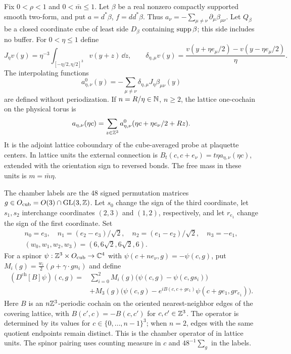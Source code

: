 Fix $0<\rho<1$ and $0<\bar m\le1$. Let $\beta$ be a real nonzero compactly
supported smooth two-form, and put $a=d^*\beta$, $f=dd^*\beta$.
Thus $a_\nu=-\sum_{\mu\ne\nu}\partial_\mu\beta_{\mu\nu}$.
Let $Q_\beta$ be a closed coordinate cube of least side $D_\beta$
containing $\operatorname{supp}\beta$; this side includes no buffer. For $0<\eta\le1$
define
\[
 J_\eta v(y)=\eta^{-3}\int_{[-\eta/2,\eta/2]^3}v(y+z)\,\dd z,
 \qquad
 \delta_{\eta,\mu}v(y)=
      \frac{v(y+\eta e_\mu/2)-v(y-\eta e_\mu/2)}{\eta}.
\]
The interpolating functions
\begin{equation}\label{eq:response-lattice-probe}
 a_{\eta,\nu}^0(y)=-\sum_{\mu\ne\nu}
               \delta_{\eta,\mu}J_\eta\beta_{\mu\nu}(y)
\end{equation}
are defined without periodization. If $n=R/\eta\in\mathbb N$, $n\ge2$,
the lattice one-cochain on the physical torus is
\begin{equation}\label{eq:response-periodic-probe}
 a_{\eta,\nu}(\eta c)=\sum_{z\in\mathbb Z^3}
       a_{\eta,\nu}^0(\eta c+\eta e_\nu/2+Rz).
\end{equation}
It is the adjoint lattice coboundary of the cube-averaged probe
at plaquette centers. In lattice units the external connection
is $B_t(c,c+e_\nu)=t\eta a_{\eta,\nu}(\eta c)$, extended with
the orientation sign to reversed bonds. The free mass in
these units is $m=\bar m\eta$.


The chamber labels are the $48$ signed permutation matrices
$g\in O_{\mathrm{cub}}=O(3)\cap\operatorname{GL}(3,\mathbb Z)$.
Let $s_0$ change the sign of the third coordinate, let $s_1,s_2$
interchange coordinates $(2,3)$ and $(1,2)$, respectively, and let
$r_{e_1}$ change the sign of the first coordinate. Set
\begin{gather*}
 n_0=e_3,\quad n_1=(e_2-e_3)/\sqrt2,\quad
 n_2=(e_1-e_2)/\sqrt2,\quad n_3=-e_1,\\
 (w_0,w_1,w_2,w_3)=(6,6\sqrt2,6\sqrt2,6).
\end{gather*}
For a spinor $\psi:\mathbb Z^3\times O_{\mathrm{cub}}\to\mathbb C^4$ with
$\psi(c+ne_\nu,g)=-\psi(c,g)$, put
$M_i(g)=\frac{w_i}{2}(\rho+\gamma\cdot gn_i)$ and define
\begin{equation}\label{eq:prm-chamber-operator}
\begin{split}
 (D^{\mathrm{ch}}[B]\psi)(c,g)
 ={}&\sum_{i=0}^2M_i(g)\bigl(\psi(c,g)-\psi(c,gs_i)\bigr)\\
 &+M_3(g)\bigl(\psi(c,g)
       -e^{iB(c,c+ge_1)}\psi(c+ge_1,gr_{e_1})\bigr).
\end{split}
\end{equation}
Here $B$ is an $n\mathbb Z^3$-periodic cochain on the oriented nearest-neighbor
edges of the covering lattice, with $B(c',c)=-B(c,c')$ for
$c,c'\in\mathbb Z^3$. The operator is determined by its values for
$c\in\{0,\ldots,n-1\}^3$; when $n=2$, edges with the same quotient
endpoints remain distinct. This is the chamber operator
of \cite[\S2]{ChamberLattice} in lattice units.
The spinor pairing uses counting measure in $c$ and
$48^{-1}\sum_g$ in the labels.

